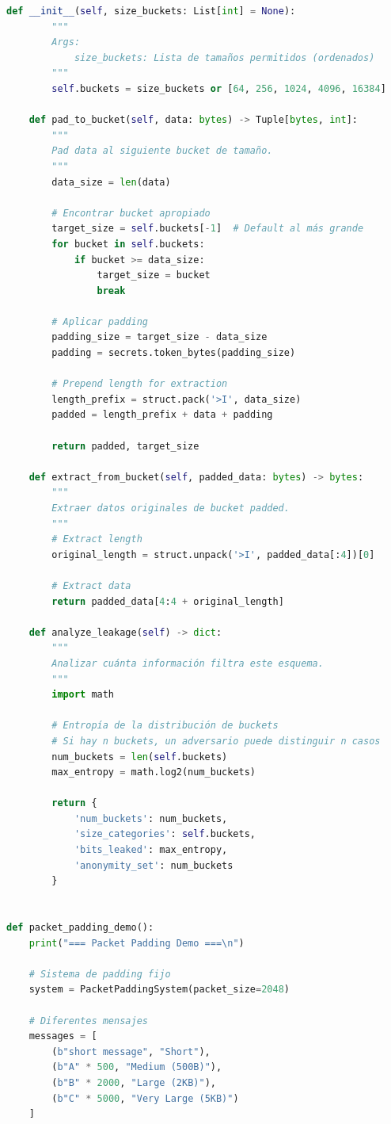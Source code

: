 \documentclass[11pt,a4paper,twoside]{book}
\theoremstyle{definition}
\theoremstyle{remark}
\begin{document}
\begin{lstlisting}[language=Python, caption={Sistema de Packet Padding}]
    def __init__(self, size_buckets: List[int] = None):
        """
        Args:
            size_buckets: Lista de tamaños permitidos (ordenados)
        """
        self.buckets = size_buckets or [64, 256, 1024, 4096, 16384]
    
    def pad_to_bucket(self, data: bytes) -> Tuple[bytes, int]:
        """
        Pad data al siguiente bucket de tamaño.
        """
        data_size = len(data)
        
        # Encontrar bucket apropiado
        target_size = self.buckets[-1]  # Default al más grande
        for bucket in self.buckets:
            if bucket >= data_size:
                target_size = bucket
                break
        
        # Aplicar padding
        padding_size = target_size - data_size
        padding = secrets.token_bytes(padding_size)
        
        # Prepend length for extraction
        length_prefix = struct.pack('>I', data_size)
        padded = length_prefix + data + padding
        
        return padded, target_size
    
    def extract_from_bucket(self, padded_data: bytes) -> bytes:
        """
        Extraer datos originales de bucket padded.
        """
        # Extract length
        original_length = struct.unpack('>I', padded_data[:4])[0]
        
        # Extract data
        return padded_data[4:4 + original_length]
    
    def analyze_leakage(self) -> dict:
        """
        Analizar cuánta información filtra este esquema.
        """
        import math
        
        # Entropía de la distribución de buckets
        # Si hay n buckets, un adversario puede distinguir n casos
        num_buckets = len(self.buckets)
        max_entropy = math.log2(num_buckets)
        
        return {
            'num_buckets': num_buckets,
            'size_categories': self.buckets,
            'bits_leaked': max_entropy,
            'anonymity_set': num_buckets
        }


def packet_padding_demo():
    print("=== Packet Padding Demo ===\n")
    
    # Sistema de padding fijo
    system = PacketPaddingSystem(packet_size=2048)
    
    # Diferentes mensajes
    messages = [
        (b"short message", "Short"),
        (b"A" * 500, "Medium (500B)"),
        (b"B" * 2000, "Large (2KB)"),
        (b"C" * 5000, "Very Large (5KB)")
    ]
    

\end{lstlisting}
\end{document}
